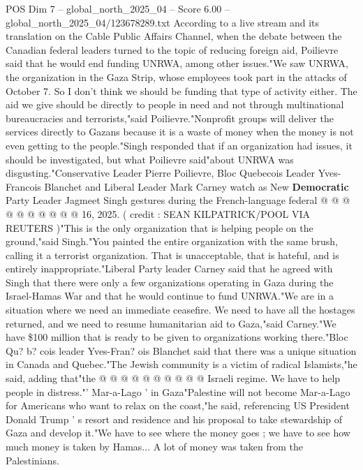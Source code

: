 \begin{textsample}{POS Dim 7 – global\_north\_2025\_04 – Score 6.00 – global\_north\_2025\_04/123678289.txt}  \label{ex:f7_pos_361}
According to a live stream and its translation on the Cable Public Affairs Channel, when the debate between the Canadian federal leaders turned to the topic of reducing foreign aid, Poilievre said that he would end funding UNRWA, among other issues."We saw UNRWA, the organization in the Gaza Strip, whose employees took part in the attacks of October 7.
So I don't think we should be funding that type of activity either.
The aid we give should be directly to people in need and not through multinational bureaucracies and terrorists,"said Poilievre."Nonprofit groups will deliver the services directly to Gazans because it is a waste of money when the money is not even getting to the people."Singh responded that if an organization had issues, it should be investigated, but what Poilievre said"about UNRWA was disgusting."Conservative Leader Pierre Poilievre, Bloc Quebecois Leader Yves-Francois Blanchet and Liberal Leader Mark Carney watch as New \textbf{Democratic} Party Leader Jagmeet Singh gestures during the French-language federal @ @ @ @ @ @ @ @ @ @ 16, 2025. ( credit : SEAN KILPATRICK/POOL VIA REUTERS )"This is the only organization that is helping people on the ground,"said Singh."You painted the entire organization with the same brush, calling it a terrorist organization.
That is unacceptable, that is hateful, and is entirely inappropriate."Liberal Party leader Carney said that he agreed with Singh that there were only a few organizations operating in Gaza during the Israel-Hamas War and that he would continue to fund UNRWA."We are in a situation where we need an immediate ceasefire.
We need to have all the hostages returned, and we need to resume humanitarian aid to Gaza,"said Carney."We have \$100 million that is ready to be given to organizations working there."Bloc Qu? b? cois leader Yves-Fran? ois Blanchet said that there was a unique situation in Canada and Quebec."The Jewish community is a victim of radical Islamists,"he said, adding that"the @ @ @ @ @ @ @ @ @ @ Israeli regime.
We have to help people in distress."' Mar-a-Lago ' in Gaza"Palestine will not become Mar-a-Lago for Americans who want to relax on the coast,"he said, referencing US President Donald Trump ' s resort and residence and his proposal to take stewardship of Gaza and develop it."We have to see where the money goes ; we have to see how much money is taken by Hamas...
A lot of money was taken from the Palestinians.

\end{textsample}
